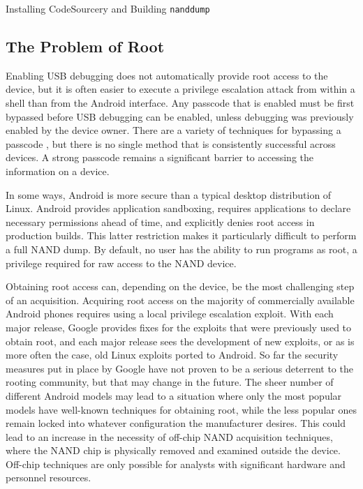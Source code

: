 \begin{table}[htb]

\caption{Installing CodeSourcery and Building \texttt{nanddump}}
\label{tab:nanddump}
\end{table}

\subsection{The Problem of Root}
Enabling USB debugging does not automatically provide root access to the device, but it is
often easier to execute a privilege escalation attack from within a shell than from the Android interface. Any passcode that is
enabled must be first bypassed before USB debugging can be enabled, unless debugging was previously enabled by the device owner.
There are a variety of techniques for bypassing a passcode \cite{hoog, lockscreenbypass0, lockscreenbypass1, lockscreenbypass2}, but
there is no single method that is consistently successful across devices.  A strong passcode remains a significant barrier to
accessing the information on a device.

In some ways, Android is more secure than a typical desktop distribution of Linux.  Android provides application sandboxing,
requires applications to declare necessary permissions ahead of time, and explicitly denies root access in production builds. This
latter restriction makes it particularly difficult to perform a full NAND dump.  By default, no user has the ability to run programs
as root, a privilege required for raw access to the NAND device.  

Obtaining root access can, depending on the device, be the most challenging step of an acquisition.  Acquiring
root access on the majority of commercially available Android phones requires using a local privilege escalation exploit.  With each
major release, Google provides fixes for the exploits that were previously used to obtain root, and each major release sees the
development of new exploits, or as is more often the case, old Linux exploits ported to Android.  So far the security measures put
in place by Google have not proven to be a serious deterrent to the rooting community, but that may change in the future.  The sheer
number of different Android models may lead to a situation where only the most popular models have well-known techniques for
obtaining root, while the less popular ones remain locked into whatever configuration the manufacturer desires.  This could lead to
an increase in the necessity of off-chip NAND acquisition techniques, where the NAND chip is physically removed and examined outside
the device. Off-chip techniques are only possible for analysts with significant hardware and personnel resources.

